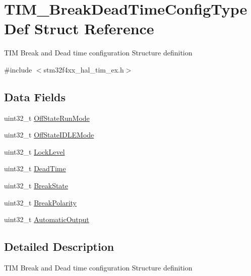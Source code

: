 \hypertarget{struct_t_i_m___break_dead_time_config_type_def}{}\section{T\+I\+M\+\_\+\+Break\+Dead\+Time\+Config\+Type\+Def Struct Reference}
\label{struct_t_i_m___break_dead_time_config_type_def}


T\+IM Break and Dead time configuration Structure definition ~\newline
  




{\ttfamily \#include $<$stm32f4xx\+\_\+hal\+\_\+tim\+\_\+ex.\+h$>$}

\subsection*{Data Fields}
\begin{DoxyCompactItemize}
\item 
uint32\+\_\+t \mbox{\hyperlink{struct_t_i_m___break_dead_time_config_type_def_af45695121f3b3fe1ab24e8fbdb56d781}{Off\+State\+Run\+Mode}}
\item 
uint32\+\_\+t \mbox{\hyperlink{struct_t_i_m___break_dead_time_config_type_def_a24f5a355f44432458801392e40a80faa}{Off\+State\+I\+D\+L\+E\+Mode}}
\item 
uint32\+\_\+t \mbox{\hyperlink{struct_t_i_m___break_dead_time_config_type_def_a5fb4b2ca5382b21df284a2d0ce75d32c}{Lock\+Level}}
\item 
uint32\+\_\+t \mbox{\hyperlink{struct_t_i_m___break_dead_time_config_type_def_a5a08cf07668e90bc708f8cccf709f2b4}{Dead\+Time}}
\item 
uint32\+\_\+t \mbox{\hyperlink{struct_t_i_m___break_dead_time_config_type_def_a2a1604bd7f46bd571a2507c5f873474f}{Break\+State}}
\item 
uint32\+\_\+t \mbox{\hyperlink{struct_t_i_m___break_dead_time_config_type_def_a9ac85dcd5135063196b8954d9b779aa7}{Break\+Polarity}}
\item 
uint32\+\_\+t \mbox{\hyperlink{struct_t_i_m___break_dead_time_config_type_def_a811ab6cfce79a2aadab7fc040413c037}{Automatic\+Output}}
\end{DoxyCompactItemize}


\subsection{Detailed Description}
T\+IM Break and Dead time configuration Structure definition ~\newline
 

